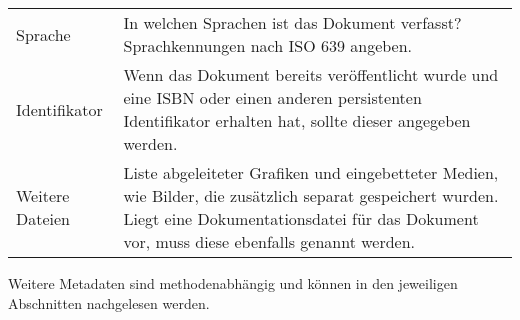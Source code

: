 \begin{center}
\begin{longtable}{L{0.3\textwidth} p{0.6\textwidth}}
		Sprache & In welchen Sprachen ist das Dokument verfasst? Sprachkennungen nach ISO 639 angeben.\\
		Identifikator & Wenn das Dokument bereits veröffentlicht wurde und eine ISBN oder einen anderen persistenten Identifikator erhalten hat, sollte dieser angegeben werden.\\
		Weitere Dateien & Liste abgeleiteter Grafiken und eingebetteter Medien, wie Bilder, die zusätzlich separat gespeichert wurden. Liegt eine Dokumentationsdatei für das Dokument vor, muss diese ebenfalls genannt werden.\\
	  \bottomrule
	\end{longtable}
\end{center}

Weitere Metadaten sind methodenabhängig und können in den jeweiligen Abschnitten nachgelesen werden.